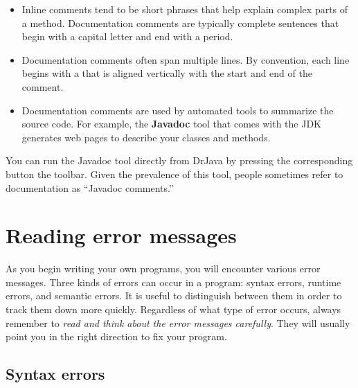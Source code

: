 \begin{itemize}
\item Inline comments tend to be short phrases that help explain complex parts of a method.
Documentation comments are typically complete sentences that begin with a capital letter and end with a period.

\item Documentation comments often span multiple lines.
By convention, each line begins with a {\tt *} that is aligned vertically with the start and end of the comment.



\item Documentation comments are used by automated tools to summarize the source code.
For example, the {\bf Javadoc} tool that comes with the JDK generates web pages to describe your classes and methods.

\end{itemize}

You can run the Javadoc tool directly from DrJava by pressing the corresponding button the toolbar.
Given the prevalence of this tool, people sometimes refer to documentation as ``Javadoc comments.''


\section{Reading error messages}


As you begin writing your own programs, you will encounter various error messages.
Three kinds of errors can occur in a program: syntax errors, runtime errors, and semantic errors.
It is useful to distinguish between them in order to track them down more quickly.
Regardless of what type of error occurs, always remember to {\em read and think about the error messages carefully}.
They will usually point you in the right direction to fix your program.

\subsection{Syntax errors}


